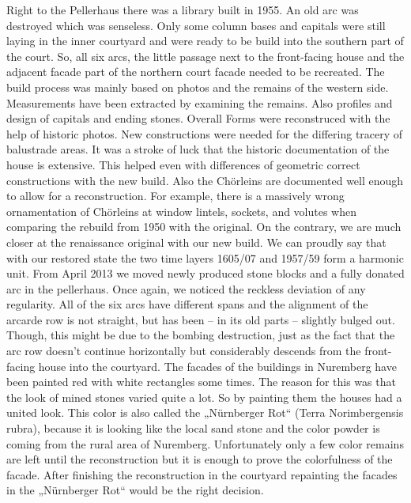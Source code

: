 Right to the Pellerhaus there was a library built in 1955. An old arc was destroyed which was senseless. Only some column bases and capitals were still laying in the inner courtyard and were ready to be build into the southern part of the court. So, all six arcs, the little passage next to the front-facing house and the adjacent facade part of the northern court facade needed to be recreated.
The build process was mainly based on photos and the remains of the western side. Measurements have been extracted by examining the remains. Also profiles and design of capitals and ending stones. Overall Forms were reconstruced with the help of historic photos. New constructions were needed for the differing tracery of balustrade areas. It was a stroke of luck that the historic documentation of the house is extensive. This helped even with differences of geometric correct constructions with the new build. Also the Chörleins are documented well enough to allow for a reconstruction. For example, there is a massively wrong ornamentation of Chörleins at window lintels, sockets, and volutes when comparing the rebuild from 1950 with the original. On the contrary, we are much closer at the renaissance original with our new build.
We can proudly say that with our restored state the two time layers 1605/07 and 1957/59 form a harmonic unit.
From April 2013 we moved newly produced stone blocks and a fully donated arc in the pellerhaus. Once again, we noticed the reckless deviation of any regularity. All of the six arcs have different spans and the alignment of the arcarde row is not straight, but has been – in its old parts – slightly bulged out. Though, this might be due to the bombing destruction, just as the fact that the arc row
doesn't continue horizontally but considerably descends from the front-facing house into the courtyard.
The facades of the buildings in Nuremberg have been painted red with white rectangles some times. The reason for this was that the look of mined stones varied quite a lot. So by painting them the houses had a united look. This color is also called the „Nürnberger Rot“ (Terra Norimbergensis rubra), because it is looking like the local sand stone and the color powder is coming from the rural area of Nuremberg. Unfortunately only a few color remains are left until the reconstruction but it is enough to prove the colorfulness of the facade. After finishing the reconstruction in the courtyard repainting the facades in the „Nürnberger Rot“ would be the right decision.\parencite{afPellerhausMagazin03} \\\\


